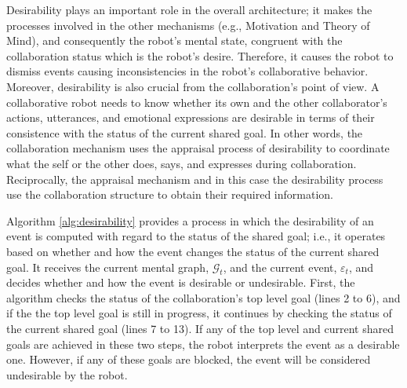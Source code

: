 \documentclass{aamas2016}
\begin{document}
\begin{algorithm}
\begin{algorithmic}[1]
				\State {}
				\State {}
				\EndIf
			\EndIf
		\EndFunction
	\end{algorithmic}
\end{algorithm}

Desirability plays an important role in the overall architecture; it makes the
processes involved in the other mechanisms (e.g., Motivation and Theory of
Mind), and consequently the robot's mental state, congruent with the
collaboration status which is the robot's desire. Therefore, it causes the robot
to dismiss events causing inconsistencies in the robot's collaborative behavior.
Moreover, desirability is also crucial from the collaboration's point of view. A
collaborative robot needs to know whether its own and the other collaborator's
actions, utterances, and emotional expressions are desirable in terms of their
consistence with the status of the current shared goal. In other words, the
collaboration mechanism uses the appraisal process of desirability to coordinate
what the self or the other does, says, and expresses during collaboration.
Reciprocally, the appraisal mechanism and in this case the desirability process
use the collaboration structure to obtain their required information.

Algorithm \ref{alg:desirability} provides a process in which the desirability of
an event is computed with regard to the status of the shared goal; i.e., it
operates based on whether and how the event changes the status of the current
shared goal. It receives the current mental graph, $\mathcal{G}_{t}$, and the
current event, $\varepsilon_t$, and decides whether and how the event is
desirable or undesirable. First, the algorithm checks the status of the
collaboration's top level goal (lines 2 to 6), and if the the top level goal is
still in progress, it continues by checking the status of the current shared
goal (lines 7 to 13). If any of the top level and current shared goals are
achieved in these two steps, the robot interprets the event as a desirable one.
However, if any of these goals are blocked, the event will be considered
undesirable by the robot.
\end{document}
